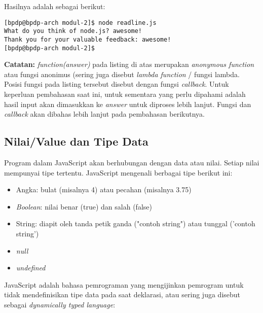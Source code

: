 Hasilnya adalah sebagai berikut:

\lstset{language=bash,caption=Hasil eksekusi readline.js}
\begin{lstlisting}
[bpdp@bpdp-arch modul-2]$ node readline.js 
What do you think of node.js? awesome!
Thank you for your valuable feedback: awesome!
[bpdp@bpdp-arch modul-2]$
\end{lstlisting}


\begin{Sbox}
\begin{minipage}{\textwidth}
\textbf{Catatan:} \textit{function(answer)} pada listing di atas merupakan \textit{anonymous function} atau fungsi anonimus (sering juga disebut \textit{lambda function} / fungsi lambda. Posisi fungsi pada listing tersebut disebut dengan fungsi \textit{callback}. Untuk keperluan pembahasan saat ini, untuk sementara yang perlu dipahami adalah hasil input akan dimasukkan ke \textit{answer} untuk diproses lebih lanjut. Fungsi dan \textit{callback} akan dibahas lebih lanjut pada pembahasan berikutnya.
\end{minipage}
\end{Sbox}
\begin{center}
\shadowbox{\TheSbox}
\end{center}

\subsection{Nilai/Value dan Tipe Data}

Program dalam JavaScript akan berhubungan dengan data atau nilai. Setiap nilai mempunyai tipe tertentu. JavaScript mengenali berbagai tipe berikut ini:
\begin{itemize}
  \item Angka: bulat (misalnya 4) atau pecahan (misalnya 3.75)
  \item \textit{Boolean}: nilai benar (true) dan salah (false)
  \item String: diapit oleh tanda petik ganda ("contoh string") atau tunggal ('contoh string')
  \item \textit{null}
  \item \textit{undefined}
\end{itemize}

JavaScript adalah bahasa pemrograman yang mengijinkan pemrogram untuk tidak mendefinisikan tipe data pada saat deklarasi, atau sering juga disebut sebagai \textit{dynamically typed language}:

